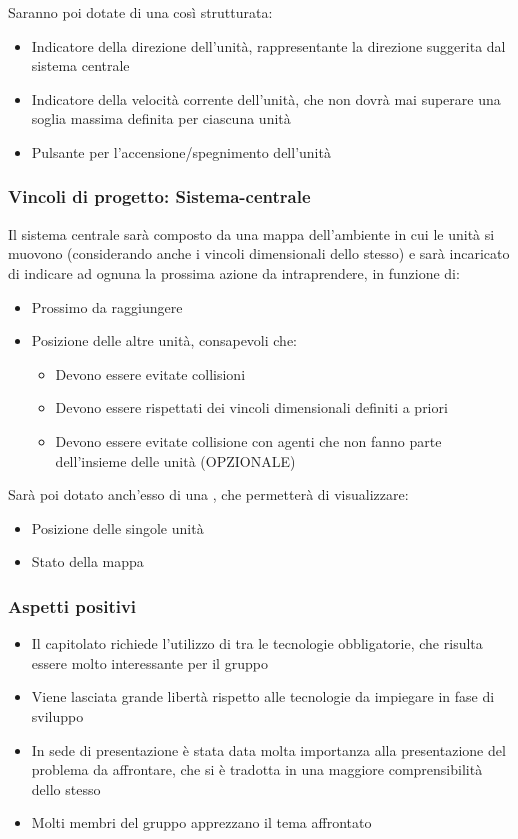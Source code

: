 \documentclass[]{article}
\begin{document}
			Saranno poi dotate di una  così strutturata:
			\begin{itemize}
				\item Indicatore della direzione dell'unità, rappresentante la direzione suggerita dal sistema centrale
				\item Indicatore della velocità corrente dell'unità, che non dovrà mai superare una soglia massima definita per ciascuna unità
				\item Pulsante per l'accensione/spegnimento dell'unità
			\end{itemize}

			\subsubsection{Vincoli di progetto: Sistema-centrale}
			Il sistema centrale sarà composto da una mappa dell'ambiente in cui le unità si muovono (considerando anche i vincoli dimensionali dello stesso) e sarà incaricato di indicare ad ognuna la prossima azione da intraprendere, in funzione di:
			\begin{itemize}
				\item Prossimo  da raggiungere
				\item Posizione delle altre unità, consapevoli che:
					\begin{itemize}
						\item Devono essere evitate collisioni
						\item Devono essere rispettati dei vincoli dimensionali definiti a priori
						\item Devono essere evitate collisione con agenti che non fanno parte dell'insieme delle unità (OPZIONALE)
					\end{itemize}
			\end{itemize}

			Sarà poi dotato anch'esso di una , che permetterà di visualizzare:
			\begin{itemize}
				\item Posizione  delle singole unità
				\item Stato  della mappa
			\end{itemize}

			\subsubsection{Aspetti positivi}
			\begin{itemize}
				\item Il capitolato richiede l'utilizzo di  tra le tecnologie obbligatorie, che risulta essere molto interessante per il gruppo
				\item Viene lasciata grande libertà rispetto alle tecnologie da impiegare in fase di sviluppo
				\item In sede di presentazione è stata data molta importanza alla presentazione del problema da affrontare, che si è tradotta in una maggiore comprensibilità dello stesso
				\item Molti membri del gruppo apprezzano il tema affrontato
			\end{itemize}
\end{document}

